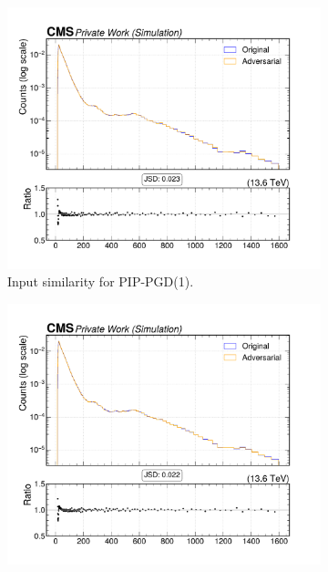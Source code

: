 \begin{figure}[htbp]
  \centering
  \begin{subfigure}[t]{0.32\textwidth}
    \includegraphics[width=\linewidth]{media/output/features/compare/combined_it_1/cmp_global_features_jet_pt.pdf}
    \caption*{Input similarity for PIP-PGD(1).}
  \end{subfigure}\hfill
  \begin{subfigure}[t]{0.32\textwidth}
    \includegraphics[width=\linewidth]{media/output/features/compare/combined_it_2/cmp_global_features_jet_pt.pdf}

\end{subfigure}
\end{figure}
